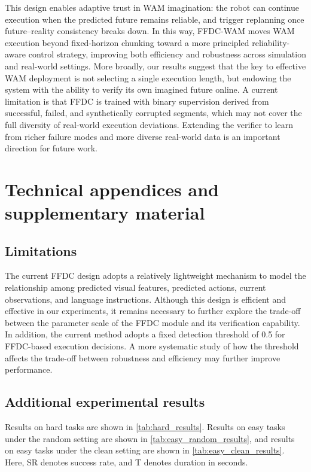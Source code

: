 \documentclass{article}
\begin{document}
This design enables adaptive trust in WAM imagination: the robot can continue execution when the predicted future remains reliable, and trigger replanning once future--reality consistency breaks down. In this way, FFDC-WAM moves WAM execution beyond fixed-horizon chunking toward a more principled reliability-aware control strategy, improving both efficiency and robustness across simulation and real-world settings. More broadly, our results suggest that the key to effective WAM deployment is not selecting a single execution length, but endowing the system with the ability to verify its own imagined future online. A current limitation is that FFDC is trained with binary supervision derived from successful, failed, and synthetically corrupted segments, which may not cover the full diversity of real-world execution deviations. Extending the verifier to learn from richer failure modes and more diverse real-world data is an important direction for future work.

\medskip
{
\small


}



\appendix

\section{Technical appendices and supplementary material}
\label{appendix}

\subsection{Limitations}
\label{sec:limitations}
The current FFDC design adopts a relatively lightweight mechanism to model the relationship among predicted visual features, predicted actions, current observations, and language instructions. Although this design is efficient and effective in our experiments, it remains necessary to further explore the trade-off between the parameter scale of the FFDC module and its verification capability. In addition, the current method adopts a fixed detection threshold of 0.5 for FFDC-based execution decisions. A more systematic study of how the threshold affects the trade-off between robustness and efficiency may further improve performance. 


\subsection{Additional experimental results}
Results on hard tasks are shown in \cref{tab:hard_results}. Results on easy tasks under the random setting are shown in \cref{tab:easy_random_results}, and results on easy tasks under the clean setting are shown in \cref{tab:easy_clean_results}. Here, SR denotes success rate, and T denotes duration in seconds.
\end{document}
